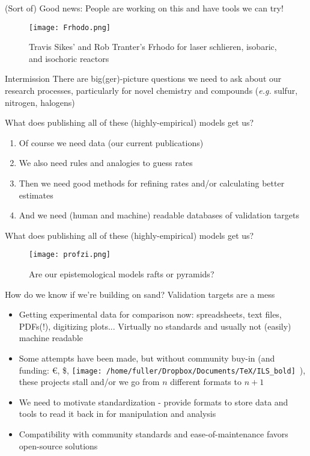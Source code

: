 \documentclass[10pt,presentation]{beamer}
\DeclareRobustCommand{\ILS}{\texttt{[image: /home/fuller/Dropbox/Documents/TeX/ILS\_bold]}}
\begin{document}
\begin{frame}{(Sort of) Good news: People are working on this and have tools we can try!}
	\begin{figure}
		\centering
		\texttt{[image: Frhodo.png]}
		\caption{Travis Sikes' and Rob Tranter's Frhodo for laser schlieren, isobaric, and isochoric reactors}
	\end{figure}
\end{frame}

\begin{frame}{Intermission}
	\centering
	{\huge There are big(ger)-picture questions we need to ask about our research processes, particularly for novel chemistry and compounds ({\it e.g.} sulfur, nitrogen, halogens)}
\end{frame}

\begin{frame}{What does publishing all of these (highly-empirical) models get us?}
	\begin{enumerate}
		\item Of course we need data (our current publications)
		\item We also need rules and analogies to guess rates
		\item Then we need good methods for refining rates and/or calculating better estimates
		\item And we need (human and machine) readable databases of validation targets
	\end{enumerate}
\end{frame}                 

\begin{frame}{What does publishing all of these (highly-empirical) models get us?}
	\begin{figure}
		\centering
		\texttt{[image: profzi.png]}
		\caption{Are our epistemological models rafts or pyramids?}
	\end{figure}
\end{frame}

\begin{frame}{How do we know if we're building on sand? Validation targets are a mess}
	\begin{itemize}
		\item Getting experimental data for comparison now: spreadsheets, text files, PDFs(!), digitizing plots... Virtually no standards and usually not (easily) machine readable
		\item Some attempts have been made, but without community buy-in (and funding: €, \$, \ILS\ ), these projects stall and/or we go from $n$ different formats to $n+1$
		\item We need to motivate standardization - provide formats to store data and tools to read it back in for manipulation and analysis
		\item Compatibility with community standards and ease-of-maintenance favors open-source solutions
	\end{itemize}
\end{frame}  
\end{document}

